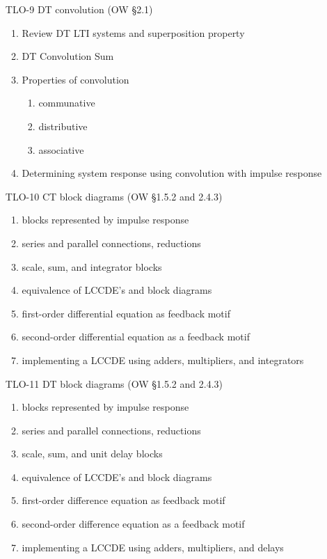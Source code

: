 \begin{enumerate}
\item[TLO-9] DT convolution (OW \S 2.1)
  \begin{enumerate}
  \item Review DT LTI systems and superposition property
  \item DT Convolution Sum
  \item Properties of convolution
    \begin{enumerate}
    \item communative 
    \item distributive
    \item associative
    \end{enumerate}
  \item Determining system response using convolution with impulse response
  \end{enumerate}
  
\item[TLO-10] CT block diagrams (OW \S 1.5.2 and 2.4.3)
  \begin{enumerate}
  \item blocks represented by impulse response
  \item series and parallel connections, reductions
  \item scale, sum, and integrator blocks
  \item equivalence of LCCDE's and block diagrams
  \item first-order differential equation as feedback motif
  \item second-order differential equation as a feedback motif
  \item implementing a LCCDE using adders, multipliers, and integrators
  \end{enumerate}

\item[TLO-11] DT block diagrams (OW \S 1.5.2 and 2.4.3)
  \begin{enumerate}
  \item blocks represented by impulse response
  \item series and parallel connections, reductions
  \item scale, sum, and unit delay blocks
  \item equivalence of LCCDE's and block diagrams
  \item first-order difference equation as feedback motif
  \item second-order difference equation as a feedback motif
  \item implementing a LCCDE using adders, multipliers, and delays
  \end{enumerate}


\end{enumerate}
